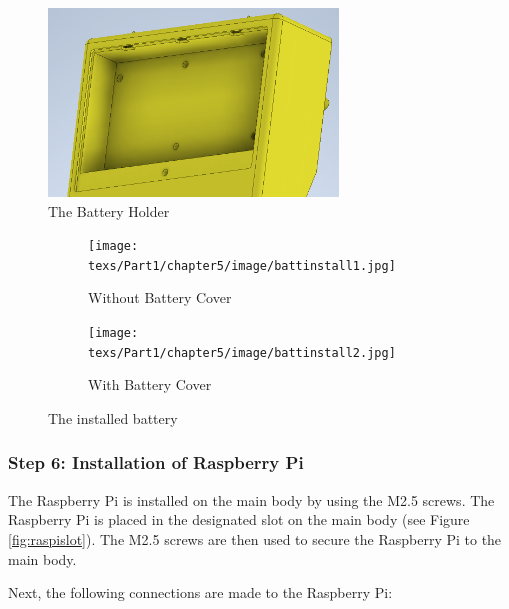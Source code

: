 \begin{figure}[!ht]
    \centering
    \includegraphics[height=5cm]{texs/Part1/chapter5/image/battslot.png}
    \caption{The Battery Holder}
    \label{fig:batteryholder}
\end{figure}

\begin{figure}[ht!]
    \centering
    \begin{subfigure}[c]{0.45\textwidth}
        \begin{minipage}{\textwidth}
            \centering
            \texttt{[image: texs/Part1/chapter5/image/battinstall1.jpg]}
        \end{minipage}
        \caption{Without Battery Cover}
        \label{fig:battery_install_1}
    \end{subfigure}
    \begin{subfigure}[c]{0.45\textwidth}
        \begin{minipage}{\textwidth}
            \centering
            \texttt{[image: texs/Part1/chapter5/image/battinstall2.jpg]}
        \end{minipage}
        \caption{With Battery Cover}
        \label{fig:battery_install_2}
    \end{subfigure}
    \caption{The installed battery}
    \label{fig:batteryinstall}
\end{figure}

\subsubsection{Step 6: Installation of Raspberry Pi}

The Raspberry Pi is installed on the main body by using the M2.5 screws. The Raspberry Pi is placed in the designated slot on the main body (see Figure \ref{fig:raspislot}). The M2.5 screws are then used to secure the Raspberry Pi to the main body.

Next, the following connections are made to the Raspberry Pi:

